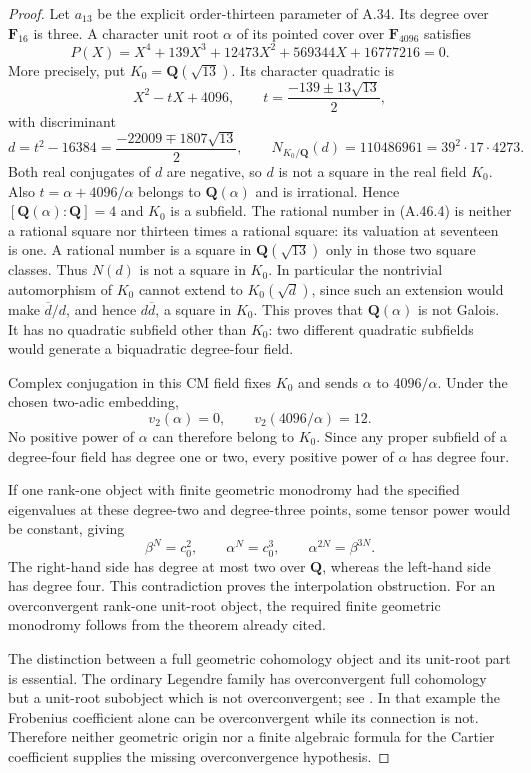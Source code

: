 \documentclass[11pt]{article}
\begin{document}
\begin{proof}
Let $a_{13}$ be the explicit order-thirteen parameter of A.34.
Its degree over $\mathbf F_{16}$ is three. A character unit root
$\alpha$ of its pointed cover over $\mathbf F_{4096}$ satisfies
\[
 P(X)=X^4+139X^3+12473X^2+569344X+16777216=0.       \tag{A.46.3}
\]
More precisely, put $K_0=\mathbf Q(\sqrt{13})$. Its character
quadratic is
\[
 X^2-tX+4096,
 \qquad t=\frac{-139\pm13\sqrt{13}}2,
\]
with discriminant
\[
 d=t^2-16384=\frac{-22009\mp1807\sqrt{13}}2,
 \qquad
 N_{K_0/\mathbf Q}(d)=110486961=39^2\cdot17\cdot4273.
                                                        \tag{A.46.4}
\]
Both real conjugates of $d$ are negative, so $d$ is not a square
in the real field $K_0$. Also $t=\alpha+4096/\alpha$ belongs to
$\mathbf Q(\alpha)$ and is irrational. Hence
$[\mathbf Q(\alpha):\mathbf Q]=4$ and $K_0$ is a subfield.
The rational number in (A.46.4) is neither a rational square nor
thirteen times a rational square: its valuation at seventeen is
one. A rational number is a square in $\mathbf Q(\sqrt{13})$
only in those two square classes. Thus $N(d)$ is not a square
in $K_0$. In particular the nontrivial automorphism of $K_0$
cannot extend to $K_0(\sqrt d)$, since such an extension would
make $\overline d/d$, and hence $d\overline d$, a square in $K_0$.
This proves that $\mathbf Q(\alpha)$ is not Galois. It has no
quadratic subfield other than $K_0$: two different quadratic
subfields would generate a biquadratic degree-four field.

Complex conjugation in this CM field fixes $K_0$ and sends
$\alpha$ to $4096/\alpha$. Under the chosen two-adic embedding,
\[
             v_2(\alpha)=0,
 \qquad v_2(4096/\alpha)=12.
\]
No positive power of $\alpha$ can therefore belong to $K_0$.
Since any proper subfield of a degree-four field has degree one
or two, every positive power of $\alpha$ has degree four.

If one rank-one object with finite geometric monodromy had the
specified eigenvalues at these degree-two and degree-three points,
some tensor power would be constant, giving
\[
                     \beta^N=c_0^2,
 \qquad \alpha^N=c_0^3,
 \qquad \alpha^{2N}=\beta^{3N}.
\]
The right-hand side has degree at most two over $\mathbf Q$,
whereas the left-hand side has degree four. This contradiction
proves the interpolation obstruction. For an overconvergent
rank-one unit-root object, the required finite geometric
monodromy follows from the theorem already cited.

The distinction between a full geometric cohomology object and
its unit-root part is essential. The ordinary Legendre family
has overconvergent full cohomology but a unit-root subobject
which is not overconvergent; see
\cite[Theorem~5.4.3.5, Corollary~5.4.3.10 and
Remark~5.4.3.11, pp.~49--52]{AC_Etesse2010}.
In that example the Frobenius coefficient alone can be
overconvergent while its connection is not. Therefore neither
geometric origin nor a finite algebraic formula for the Cartier
coefficient supplies the missing overconvergence hypothesis.
\end{proof}
\end{document}
